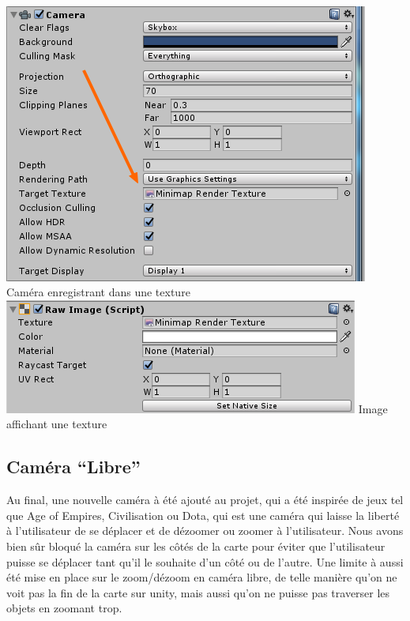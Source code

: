 \documentclass{report}
\begin{document}
\paragraph{}
\begin{center}
\includegraphics[scale=0.6]{DATA/textureminimap.png}
 {Caméra enregistrant dans une texture}
\includegraphics[scale=0.7]{DATA/imageminimap.png}
 {Image affichant une texture}
\end{center}
\paragraph{}

\subsection{Caméra “Libre”}

Au final, une nouvelle caméra à été ajouté au projet, qui a été inspirée de jeux tel que Age of Empires, Civilisation ou Dota, qui est une caméra qui laisse la liberté à l’utilisateur de se déplacer et de dézoomer ou zoomer à l’utilisateur. Nous avons bien sûr bloqué la caméra sur les côtés de la carte pour éviter que l’utilisateur puisse se déplacer tant qu’il le souhaite d’un côté ou de l’autre.
Une limite à aussi été mise en place sur le zoom/dézoom en caméra libre, de telle manière qu’on ne voit pas la fin de la carte sur unity, mais aussi qu’on ne puisse pas traverser les objets en zoomant trop. 
\end{document}
